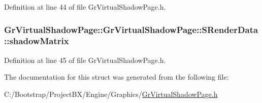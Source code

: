 Definition at line 44 of file GrVirtualShadowPage.h.\hypertarget{struct_gr_virtual_shadow_page_1_1_s_render_data_fbc32f8ea7f4548ba9f2bd708dd7e333}{
\subsubsection[{shadowMatrix}]{ GrVirtualShadowPage::GrVirtualShadowPage::SRenderData::shadowMatrix}}
\label{struct_gr_virtual_shadow_page_1_1_s_render_data_fbc32f8ea7f4548ba9f2bd708dd7e333}




Definition at line 45 of file GrVirtualShadowPage.h.

The documentation for this struct was generated from the following file:\begin{CompactItemize}
\item 
C:/Bootstrap/ProjectBX/Engine/Graphics/\hyperlink{_gr_virtual_shadow_page_8h}{GrVirtualShadowPage.h}\end{CompactItemize}
